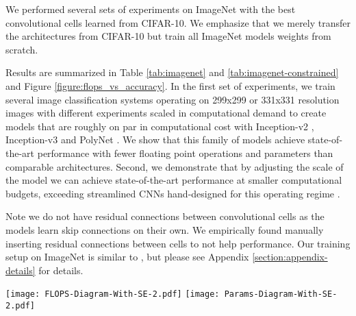 We performed several sets of experiments on ImageNet with the best convolutional cells learned from CIFAR-10.
We emphasize that we merely transfer the architectures from CIFAR-10 but train all ImageNet models weights from scratch.

Results are summarized in Table \ref{tab:imagenet} and \ref{tab:imagenet-constrained} and Figure \ref{figure:flops_vs_accuracy}. In the first set of experiments, we train several image classification systems operating on 299x299 or 331x331 resolution images with different experiments scaled in computational demand to create models that are roughly on par in computational cost with Inception-v2 \cite{BatchNorm}, Inception-v3 \cite{szegedy2016rethinking} and PolyNet \cite{zhang2016polynet}.
We show that this family of models achieve state-of-the-art performance with fewer floating point operations and parameters than comparable architectures. Second, we demonstrate that by adjusting the scale of the model we can achieve state-of-the-art performance at smaller computational budgets, exceeding streamlined CNNs hand-designed for this operating regime \cite{howard2017mobilenets, shufflenet}.

Note we do not have residual connections between convolutional cells as the models learn skip connections on their own. We empirically found manually inserting residual connections between cells to not help performance.
Our training setup on ImageNet is similar to \cite{szegedy2016rethinking}, but please see Appendix \ref{section:appendix-details} for details.


\begin{figure*}[h!]
\begin{center}
\texttt{[image: FLOPS-Diagram-With-SE-2.pdf]}
\hfill
\texttt{[image: Params-Diagram-With-SE-2.pdf]}
\caption{Accuracy versus computational demand (left) and number of parameters (right) across top performing published CNN architectures on ImageNet 2012 ILSVRC challenge prediction task. Computational demand is measured in the number of floating-point multiply-add operations to process a single image. Black circles indicate previously published results and red squares highlight our proposed models.}
\label{figure:flops_vs_accuracy}
\end{center}
\end{figure*}

